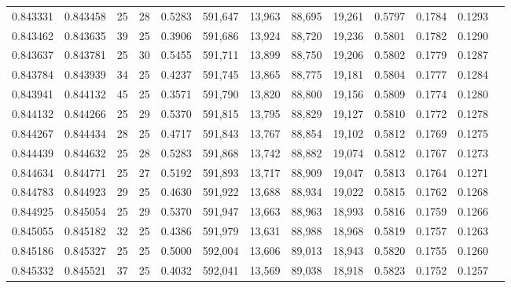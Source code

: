 \begin{tabular}{rrrrrrrrrrrrr}
0.843331 & 0.843458 &    25 &  28 &                                     0.5283 & 591,647 &  13,963 &  88,695 &  19,261 & 0.5797 & 0.1784 & 0.1293 \\
0.843462 & 0.843635 &    39 &  25 &                                     0.3906 & 591,686 &  13,924 &  88,720 &  19,236 & 0.5801 & 0.1782 & 0.1290 \\
0.843637 & 0.843781 &    25 &  30 &                                     0.5455 & 591,711 &  13,899 &  88,750 &  19,206 & 0.5802 & 0.1779 & 0.1287 \\
0.843784 & 0.843939 &    34 &  25 &                                     0.4237 & 591,745 &  13,865 &  88,775 &  19,181 & 0.5804 & 0.1777 & 0.1284 \\
0.843941 & 0.844132 &    45 &  25 &                                     0.3571 & 591,790 &  13,820 &  88,800 &  19,156 & 0.5809 & 0.1774 & 0.1280 \\
0.844132 & 0.844266 &    25 &  29 &                                     0.5370 & 591,815 &  13,795 &  88,829 &  19,127 & 0.5810 & 0.1772 & 0.1278 \\
0.844267 & 0.844434 &    28 &  25 &                                     0.4717 & 591,843 &  13,767 &  88,854 &  19,102 & 0.5812 & 0.1769 & 0.1275 \\
0.844439 & 0.844632 &    25 &  28 &                                     0.5283 & 591,868 &  13,742 &  88,882 &  19,074 & 0.5812 & 0.1767 & 0.1273 \\
0.844634 & 0.844771 &    25 &  27 &                                     0.5192 & 591,893 &  13,717 &  88,909 &  19,047 & 0.5813 & 0.1764 & 0.1271 \\
0.844783 & 0.844923 &    29 &  25 &                                     0.4630 & 591,922 &  13,688 &  88,934 &  19,022 & 0.5815 & 0.1762 & 0.1268 \\
0.844925 & 0.845054 &    25 &  29 &                                     0.5370 & 591,947 &  13,663 &  88,963 &  18,993 & 0.5816 & 0.1759 & 0.1266 \\
0.845055 & 0.845182 &    32 &  25 &                                     0.4386 & 591,979 &  13,631 &  88,988 &  18,968 & 0.5819 & 0.1757 & 0.1263 \\
0.845186 & 0.845327 &    25 &  25 &                                     0.5000 & 592,004 &  13,606 &  89,013 &  18,943 & 0.5820 & 0.1755 & 0.1260 \\
0.845332 & 0.845521 &    37 &  25 &                                     0.4032 & 592,041 &  13,569 &  89,038 &  18,918 & 0.5823 & 0.1752 & 0.1257 \\

\end{tabular}
